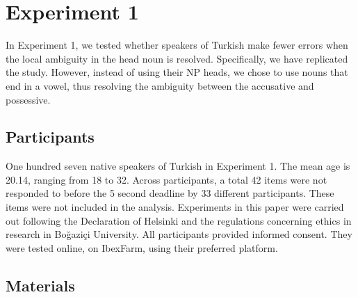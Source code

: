 \documentclass[doc,a4paper,man,natbib,floatsintext,noextraspace]{apa6}\usepackage[]{graphicx}\usepackage[]{color}
\begin{document}




\section{Experiment 1} \label{sec:exp1}



In Experiment 1, we tested whether speakers of Turkish make fewer errors when the local ambiguity in the head noun is resolved. Specifically, we have replicated the \citet{LagoEtAl:2018} study. However, instead of using their NP heads, we chose to use nouns that end in a vowel, thus resolving the ambiguity between the accusative and possessive. 

\subsection{Participants} \label{sec:exp1:participants}

One hundred seven native speakers of Turkish in Experiment 1. The mean age is 20.14, ranging from 18 to 32. Across participants, a total 42 items were not responded to before the 5 second deadline by 33 different participants. These items were not included in the analysis. Experiments in this paper were carried out following the Declaration of Helsinki and the regulations concerning ethics in research in Bo\u{g}azi\c{c}i University. All participants provided informed consent. They were tested online, on IbexFarm, using their preferred platform. 

\subsection{Materials} \label{sec:exp1:materials}
\end{document}
